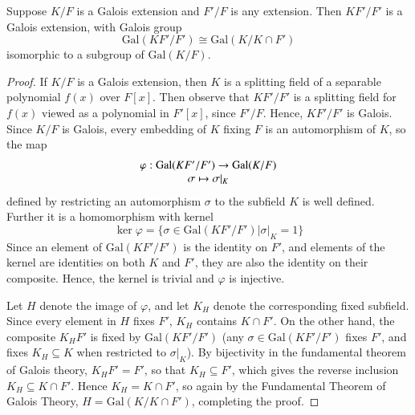\documentclass[12pt, a4paper, oneside, openright, titlepage]{book}
\begin{document}
\begin{prop}\label{prop:galtrans}
    Suppose $K/F$ is a Galois extension and $F'/F$ is any extension. Then $KF'/F'$ is a Galois extension, with Galois group \begin{equation*}
        \text{Gal}(KF'/F') \cong \text{Gal}(K/K\cap F')
    \end{equation*}
    isomorphic to a subgroup of $\text{Gal}(K/F)$.
    \begin{center}
    \end{center}
\end{prop}
\begin{proof}
    If $K/F$ is a Galois extension, then $K$ is a splitting field of a separable polynomial $f(x)$ over $F[x]$. Then observe that $KF'/F'$ is a splitting field for $f(x)$ viewed as a polynomial in $F'[x]$, since $F'/F$.  Hence, $KF'/F'$ is Galois. Since $K/F$ is Galois, every embedding of $K$ fixing $F$ is an automorphism of $K$, so the map \begin{equation*}
        \begin{array}{c} \varphi:\text{Gal}(KF'/F')\rightarrow \text{Gal}(K/F) \\ \sigma\mapsto \sigma\vert_K \end{array}
    \end{equation*}
    defined by restricting an automorphism $\sigma$ to the subfield $K$ is well defined. Further it is a homomorphism with kernel \begin{equation*}
        \ker \varphi = \{\sigma \in \text{Gal}(KF'/F')\vert \sigma\vert_K = 1\}
    \end{equation*}
    Since an element of $\text{Gal}(KF'/F')$ is the identity on $F'$, and elements of the kernel are identities on both $K$ and $F'$, they are also the identity on their composite. Hence, the kernel is trivial and $\varphi$ is injective. 

    Let $H$ denote the image of $\varphi$, and let $K_H$ denote the corresponding fixed subfield. Since every element in $H$ fixes $F'$, $K_H$ contains $K\cap F'$. On the other hand, the composite $K_HF'$ is fixed by $\text{Gal}(KF'/F')$ (any $\sigma \in \text{Gal}(KF'/F')$ fixes $F'$, and fixes $K_H \subseteq K$ when restricted to $\sigma\vert_K$). By bijectivity in the fundamental theorem of Galois theory, $K_HF' = F'$, so that $K_H \subseteq F'$, which gives the reverse inclusion $K_H \subseteq K\cap F'$. Hence $K_H = K\cap F'$, so again by the Fundamental Theorem of Galois Theory, $H = \text{Gal}(K/K\cap F')$, completing the proof.
\end{proof}
\end{document}

